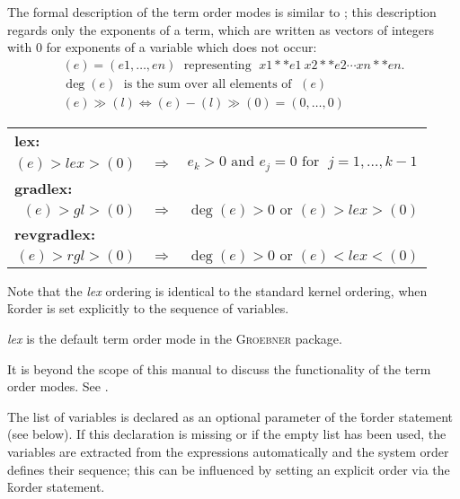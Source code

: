 The formal description of the term order modes is similar to
\cite{Kredel:88}; this description regards only the exponents of a term,
which are written as vectors of integers with $0$ for exponents of a
variable which does not occur:
\[
\begin{array}{l}
  (e) = (e1,\ldots , en) \;\mbox{ representing }\; x1**e1 \ x2**e2 \cdots
  xn**en. \\
  \deg(e) \; \mbox{ is the sum over all elements of } \;(e) \\
  (e) \gg (l) \Longleftrightarrow (e)-(l)\gg (0) = (0,\ldots ,0)
\end{array}
\]
\begin{center}
\begin{tabular}{@{}rll}
  \multicolumn{1}{l}{\hspace*{-.5cm}\textbf{lex:}} \\
  $(e) > lex > (0)$ & $\Longrightarrow$ & $e_k > 0 \mbox{ and } e_j =0
  \mbox{ for }\; j=1,\ldots , k-1$ \\[2mm]
  \multicolumn{1}{l}{\hspace*{-.5cm}\textbf{gradlex:}} \\
  $(e) >gl> (0)$    & $\Longrightarrow$ & $\deg(e)>0  \mbox { or } (e) >lex> (0)$ \\[2mm]
  \multicolumn{1}{l}{\hspace*{-.5cm}\textbf{revgradlex:}} \\
  $(e) >rgl> (0)$   & $\Longrightarrow$ & $\deg(e)>0  \mbox{ or }(e)  <lex< (0)$
\end{tabular}
\end{center}

Note that the \emph{lex} ordering is identical to the standard \REDUCE
kernel ordering, when \f{korder} is set explicitly to the sequence of
variables.

\emph{lex} is the default term order mode in the \textsc{Groebner} package.

It is beyond the scope of this manual to discuss the functionality of
the term order modes. See \cite{Buchberger:88}.

The list of variables is declared as an optional parameter of the
\f{torder} statement (see below). If this declaration is missing
or if the empty list has been used, the variables are extracted from
the expressions automatically and the \REDUCE system order defines
their sequence; this can be influenced by setting an explicit order
via the \f{korder} statement.

